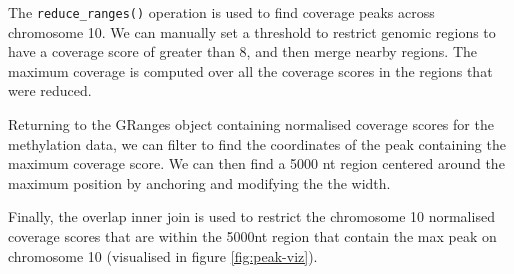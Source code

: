 \documentclass[10pt,letterpaper]{article}
\newenvironment{Shaded}{\begin{snugshade}}{\end{snugshade}}
\newcommand{\KeywordTok}[1]{\textcolor[rgb]{0.13,0.29,0.53}{\textbf{#1}}}
\newcommand{\DataTypeTok}[1]{\textcolor[rgb]{0.13,0.29,0.53}{#1}}
\newcommand{\DecValTok}[1]{\textcolor[rgb]{0.00,0.00,0.81}{#1}}
\newcommand{\StringTok}[1]{\textcolor[rgb]{0.31,0.60,0.02}{#1}}
\newcommand{\OperatorTok}[1]{\textcolor[rgb]{0.81,0.36,0.00}{\textbf{#1}}}
\newcommand{\NormalTok}[1]{#1}
\begin{document}
The \texttt{reduce\_ranges()} operation is used to find coverage peaks
across chromosome 10. We can manually set a threshold to restrict
genomic regions to have a coverage score of greater than 8, and then
merge nearby regions. The maximum coverage is computed over all the
coverage scores in the regions that were reduced.

\begin{Shaded}
\end{Shaded}

Returning to the GRanges object containing normalised coverage scores
for the methylation data, we can filter to find the coordinates of the
peak containing the maximum coverage score. We can then find a 5000 nt
region centered around the maximum position by anchoring and modifying
the the width.

\begin{Shaded}
\end{Shaded}

Finally, the overlap inner join is used to restrict the chromosome 10
normalised coverage scores that are within the 5000nt region that
contain the max peak on chromosome 10 (visualised in figure
\ref{fig:peak-viz}).

\begin{Shaded}
\end{Shaded}
\end{document}
